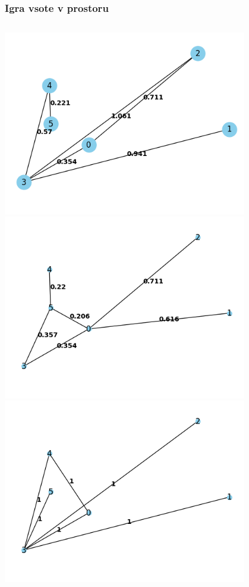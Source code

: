 \documentclass[12pt, hyperref={unicode}]{beamer}
\begin{document}

\begin{frame}
  
  \frametitle{Igra vsote v prostoru}
  \begin{columns}
    \includegraphics[width=0.8\textwidth]{imput_1.png}
    \includegraphics[width=0.8\textwidth]{output_1.png}
    \includegraphics[width=0.8\textwidth]{output_2.png}
  \end{columns}
  
\end{frame}
\end{document}
